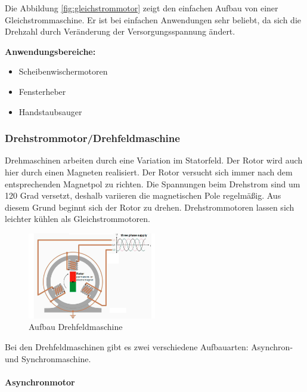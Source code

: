 Die Abbildung \ref{fig:gleichstrommotor} zeigt den einfachen Aufbau von einer Gleichstrommaschine. Er ist bei einfachen Anwendungen sehr beliebt, da sich die Drehzahl durch Veränderung der Versorgungsspannung ändert.\newline

\textbf{Anwendungsbereiche:}

\begin{itemize}
	\item{Scheibenwischermotoren}
	\item{Fensterheber}
	\item{Handstaubsauger}
\end{itemize}

\subsubsection{Drehstrommotor/Drehfeldmaschine}
\label{sec:drehstrom}

Drehmaschinen arbeiten durch eine Variation im Statorfeld. Der Rotor wird auch hier durch einen Magneten realisiert. Der Rotor versucht sich immer nach dem entsprechenden Magnetpol zu richten. Die Spannungen beim Drehstrom sind um 120 Grad versetzt, deshalb variieren die magnetischen Pole regelmäßig. Aus diesem Grund beginnt sich der Rotor zu drehen. Drehstrommotoren lassen sich leichter kühlen als Gleichstrommotoren. 

\begin{figure}[H]
\begin{center}
	\includegraphics[width=0.5\textwidth]{fig/Drehstrommotor}
	\caption{Aufbau Drehfeldmaschine \cite{funktionDrehstrommotor}}
\end{center}
\end{figure}

Bei den Drehfeldmaschinen gibt es zwei verschiedene Aufbauarten: Asynchron- und Synchronmaschine.

\paragraph{Asynchronmotor}
\label{sec:asynchronmotor}

